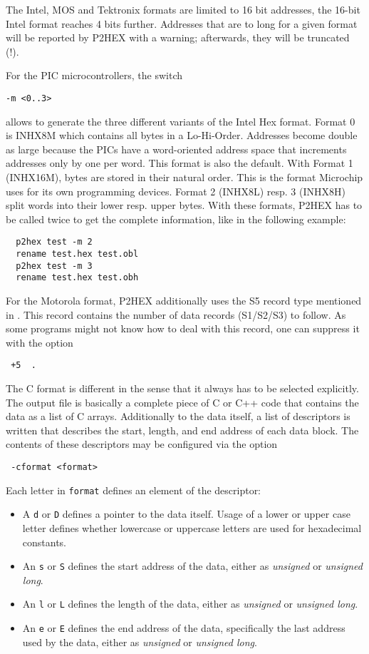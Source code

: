 \documentclass[12pt,twoside]{report}
\begin{document}
The Intel, MOS and Tektronix formats are limited to 16 bit addresses, the
16-bit Intel format reaches 4 bits further.  Addresses that are to long
for a given format will be reported by P2HEX with a warning; afterwards,
they will be truncated (!).

For the PIC microcontrollers, the switch
\begin{verbatim}
-m <0..3>
\end{verbatim}
allows to generate the three different variants of the Intel Hex
format.  Format 0 is INHX8M which contains all bytes in a
Lo-Hi-Order.  Addresses become double as large because the PICs have
a word-oriented address space that increments addresses only by one
per word.  This format is also the default.  With Format 1 (INHX16M),
bytes are stored in their natural order.  This is the format
Microchip uses for its own programming devices.  Format 2 (INHX8L)
resp. 3 (INHX8H) split words into their lower resp. upper bytes.
With these formats, P2HEX has to be called twice to get the complete
information, like in the following example:
\begin{verbatim}
  p2hex test -m 2
  rename test.hex test.obl
  p2hex test -m 3
  rename test.hex test.obh
\end{verbatim}
For the Motorola format, P2HEX additionally uses the S5 record type
mentioned in \cite{CPM68K}.  This record contains the number of data
records (S1/S2/S3) to follow.  As some programs might not know how to
deal with this record, one can suppress it with the option
\begin{verbatim}
 +5  .
\end{verbatim}
The C format is different in the sense that it always has to be
selected explicitly.  The output file is basically a complete piece of
C or C++ code that contains the data as a list of C arrays.  Additionally to
the data itself, a list of descriptors is written that describes the
start, length, and end address of each data block.  The contents of these
descriptors may be configured via the option
\begin{verbatim}
 -cformat <format>
\end{verbatim}
Each letter in \verb!format! defines an element of the descriptor:
\begin{itemize}
\item{A \verb!d! or \verb!D! defines a pointer to the data itself.
      Usage of a lower or upper case letter defines whether lowercase
      or uppercase letters are used for hexadecimal constants.}
\item{An \verb!s! or \verb!S! defines the start address of the data,
      either as {\em unsigned} or {\em unsigned long}.}
\item{An \verb!l! or \verb!L! defines the length of the data,
      either as {\em unsigned} or {\em unsigned long}.}
\item{An \verb!e! or \verb!E! defines the end address of the data,
      specifically the last address used by the data, either as
      {\em unsigned} or {\em unsigned long}.} 
\end{itemize}
\end{document}

